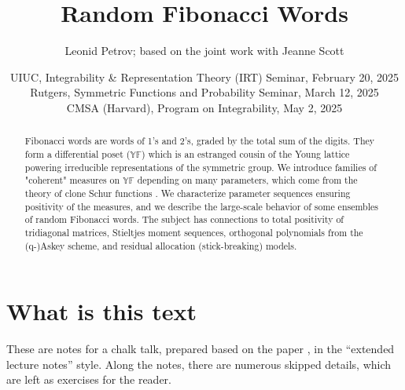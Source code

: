 \documentclass[letterpaper,11pt,oneside,reqno]{article}
\numberwithin{equation}{section}
\theoremstyle{definition}
\begin{document}
\title{Random Fibonacci Words}


\author{Leonid Petrov; based on the joint work with Jeanne Scott \cite{PetrovScott2024Fibonacci}}

\date{UIUC, Integrability \& Representation Theory (IRT) Seminar, February 20, 2025\\
Rutgers,
Symmetric Functions and Probability Seminar, March 12, 2025\\
CMSA (Harvard), Program on Integrability, May 2, 2025}


\maketitle

\begin{abstract}
	Fibonacci words are words of 1's and 2's, graded by the total sum of the digits. They form a differential poset ($\mathbb{YF}$) which is an estranged cousin of the Young lattice powering irreducible representations of the symmetric group. We introduce families of "coherent" measures on $\mathbb{YF}$ depending on many parameters, which come from the theory of clone Schur functions \cite{okada1994algebras}. We characterize parameter sequences ensuring positivity of the measures, and we describe the large-scale behavior of some ensembles of random Fibonacci words. The subject has connections to total positivity of tridiagonal matrices, Stieltjes moment sequences, orthogonal polynomials from the (q-)Askey scheme, and residual allocation (stick-breaking) models.
\end{abstract}

\section*{What is this text}

These are notes for a chalk talk, prepared based on the paper
\cite{PetrovScott2024Fibonacci}, in the ``extended lecture notes''
style.
Along the notes, there are numerous skipped details,
which are left as exercises for the reader.

\setcounter{tocdepth}{1}
\tableofcontents
\setcounter{tocdepth}{3}
\newpage
\end{document}
